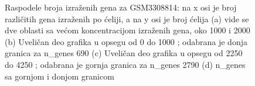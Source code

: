 \documentclass{article}
\begin{document}
\begin{figure}[H]
    \centering
    \caption{ Raspodele broja izraženih gena za GSM3308814: na x osi je broj različitih gena izraženih po ćeliji, a na y osi je broj ćelija (a) vide se dve oblasti sa većom koncentracijom izraženih gena, oko 1000 i 2000 (b) Uveličan deo grafika u opsegu od 0 do 1000 ; odabrana je donja granica za n\_genes 690 (c) Uveličan deo grafika u opsegu od 2250 do 4250 ; odabrana je gornja granica za n\_genes 2790 (d) n\_genes sa gornjom i donjom granicom }
    \label{fig:n_genes_GSM3308814_hist_qc}
\end{figure}
\end{document}
